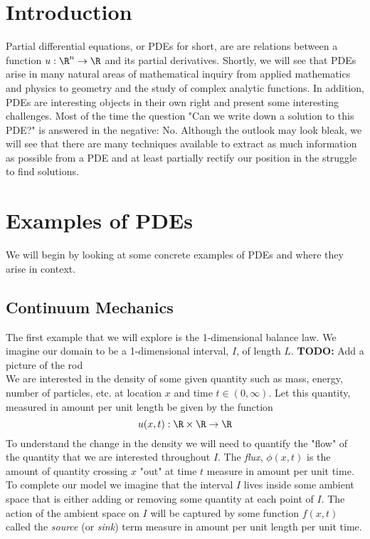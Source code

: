 \documentclass{bkcnotes}
\newcommand{\todo}[1]{{\bf TODO: } #1\\}
\begin{document}
\maketitle

\section{Introduction}
Partial differential equations, or PDEs for short, are are relations
between a function $u: \R^n \to \R$ and its partial
derivatives. Shortly, we will see that PDEs arise in many natural
areas of mathematical inquiry from applied mathematics and physics to
geometry and the study of complex analytic functions. In addition,
PDEs are interesting objects in their own right and present some
interesting challenges. Most of the time the question "Can we write
down a solution to this PDE?" is answered in the negative:
No. Although the outlook may look bleak, we will see that there are
many techniques available to extract as much information as possible
from a PDE and at least partially rectify our position in the struggle
to find solutions.

\section{Examples of PDEs}
We will begin by looking at some concrete examples of PDEs and where
they arise in context.

\subsection{Continuum Mechanics}
The first example that we will explore is the 1-dimensional balance
law. We imagine our domain to be a 1-dimensional interval, $I$, of
length $L$. 
\todo{Add a picture of the rod}
We are interested in the density of some given quantity
such as mass, energy, number of particles, etc. at location $x$ and
time $t \in (0,\infty)$. Let this quantity, measured in amount per
unit length be given by the function 
\[
u(x,t) : \R \times \R \to \R
\] 
To understand the change in the density we will need to quantify the
"flow" of the quantity that we are interested throughout $I$. The
\textit{flux}, $\phi(x,t)$ is the amount of quantity crossing $x$
"out" at time $t$ measure in amount per unit time. To complete our
model we imagine that the interval $I$ lives inside some ambient space
that is either adding or removing some quantity at each point of
$I$. The action of the ambient space on $I$ will be captured by some
function $f(x,t)$ called the \textit{source} (or \textit{sink})
term measure in amount per unit length per unit time.
\end{document}
